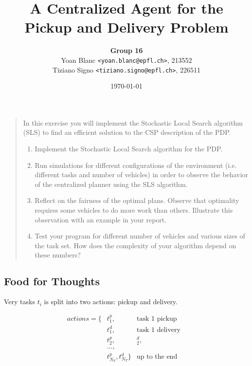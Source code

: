 \documentclass[11pt,a4paper]{article}
\title{\phantomsection%
    A Centralized Agent for the Pickup and Delivery Problem
}
\author{
    \textbf{Group 16}\\
    Yoan Blanc \texttt{<yoan.blanc@epfl.ch>}, 213552\\
    Tiziano Signo \texttt{<tiziano.signo@epfl.ch>}, 226511
}
\date{\today}
\begin{document}
\maketitle

\noindent
\begin{quote}{\it

    In this exercise you will implement the Stochastic Local Search algorithm
    (SLS) to find an efficient solution to the CSP description of the PDP.

    \begin{enumerate}
        \item Implement the Stochastic Local Search algorithm for the PDP.

        \item Run simulations for different configurations of the environment
        (i.e. different tasks and number of vehicles) in order to observe the
        behavior of the centralized planner using the SLS algorithm.

        \item Reflect on the fairness of the optimal plans. Observe that
        optimality requires some vehicles to do more work than others.
        Illustrate this observation with an example in your report.

        \item Test your program for different number of vehicles and various
        sizes of the task set. How does the complexity of your algorithm depend
        on these numbers?

    \end{enumerate}

}\end{quote}

\newpage
\subsection*{Food for Thoughts}

Very tasks $t_i$ is split into two actions: pickup and delivery.

\begin{align*}
actions = \{&t_1^p,                                     & \text{task $1$ pickup} \\
          &t_1^d,                                     & \text{task $1$ delivery} \\
          &t_2^p, &_2^d,                              & \\
          &\dots,                                     & \\
          &t_{N_T}^p, t_{N_T}^d\}                     & \text{up to the end}
\end{align*}
\end{document}
